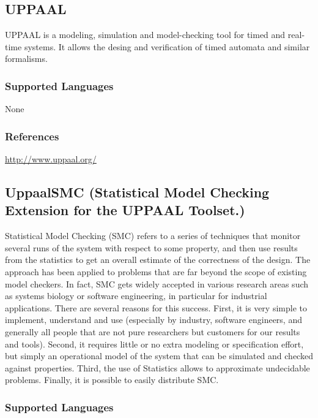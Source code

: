 \subsection{UPPAAL}
\label{subsecT:UPPAAL}

UPPAAL is a modeling, simulation and model-checking tool for timed and real-time systems.
It allows the desing and verification of timed automata and similar formalisms.

\subsubsection{Supported Languages}

None


\subsubsection{References}

\url{http://www.uppaal.org/}



\subsection{UppaalSMC (Statistical Model Checking Extension for the UPPAAL Toolset.)}
\label{subsecT:UppaalSMC}


Statistical Model Checking (SMC) refers to a series of techniques that monitor several runs of the system with respect to some property, and then use results from the statistics to get an overall estimate of the correctness of the design. The approach has been applied to problems that are far beyond the scope of existing model checkers. In fact, SMC gets widely accepted in various research areas such as systems biology or software engineering, in particular for industrial applications. There are several reasons for this success. First, it is very simple to implement, understand and use (especially by industry, software engineers, and generally all people that are not pure researchers but customers for our results and tools). Second, it requires little or no extra modeling or specification effort, but simply an operational model of the system that can be simulated and checked against properties. Third, the use of Statistics allows to approximate undecidable problems. Finally, it is possible to easily distribute SMC.

\subsubsection{Supported Languages}

